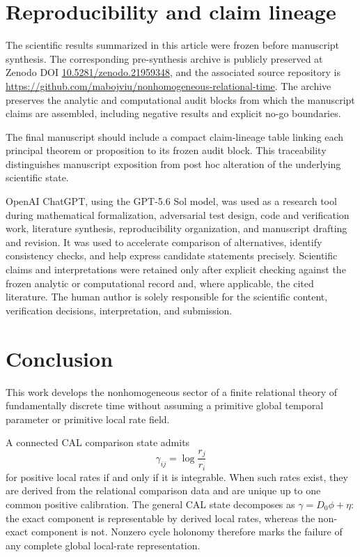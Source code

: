 \documentclass[aip,jmp,amsmath,amssymb,reprint]{revtex4-2}
\begin{document}
\section{Reproducibility and claim lineage}\label{sec:workflow}

The scientific results summarized in this article were frozen before manuscript synthesis. The corresponding pre-synthesis archive is publicly preserved at Zenodo DOI \href{https://doi.org/10.5281/zenodo.21959348}{10.5281/zenodo.21959348}, and the associated source repository is \url{https://github.com/mabojviu/nonhomogeneous-relational-time}. The archive preserves the analytic and computational audit blocks from which the manuscript claims are assembled, including negative results and explicit no-go boundaries.

The final manuscript should include a compact claim-lineage table linking each principal theorem or proposition to its frozen audit block. This traceability distinguishes manuscript exposition from post hoc alteration of the underlying scientific state.

OpenAI ChatGPT, using the GPT-5.6 Sol model, was used as a research tool during mathematical formalization, adversarial test design, code and verification work, literature synthesis, reproducibility organization, and manuscript drafting and revision. It was used to accelerate comparison of alternatives, identify consistency checks, and help express candidate statements precisely. Scientific claims and interpretations were retained only after explicit checking against the frozen analytic or computational record and, where applicable, the cited literature. The human author is solely responsible for the scientific content, verification decisions, interpretation, and submission.

\section{Conclusion}\label{sec:conclusion}

This work develops the nonhomogeneous sector of a finite relational theory of fundamentally discrete time without assuming a primitive global temporal parameter or primitive local rate field.

A connected CAL comparison state admits
\begin{equation}
\gamma_{ij}=\log\frac{r_j}{r_i}
\end{equation}
for positive local rates if and only if it is integrable. When such rates exist, they are derived from the relational comparison data and are unique up to one common positive calibration. The general CAL state decomposes as $\gamma=D_0\phi+\eta$: the exact component is representable by derived local rates, whereas the non-exact component is not. Nonzero cycle holonomy therefore marks the failure of any complete global local-rate representation.
\end{document}
